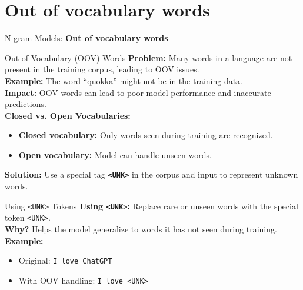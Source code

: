 \section{Out of vocabulary words}
\begin{frame}{}
    \LARGE N-gram Models: \textbf{Out of vocabulary words}
\end{frame}

\begin{frame}{Out of Vocabulary (OOV) Words}
    \textbf{Problem:} Many words in a language are not present in the training corpus, leading to OOV issues. \\
    \vspace{1em}
    \pause
    \textbf{Example:} The word ``quokka'' might not be in the training data. \\
    \vspace{1em}
    \pause
    \textbf{Impact:} OOV words can lead to poor model performance and inaccurate predictions. \\
    \vspace{1em}
    \pause
    \textbf{Closed vs. Open Vocabularies:}
    \begin{itemize}
        \item \textbf{Closed vocabulary:} Only words seen during training are recognized.
        \item \textbf{Open vocabulary:} Model can handle unseen words.
    \end{itemize}
    \vspace{0.5em}
    \pause
    \textbf{Solution:} Use a special tag \textbf{\texttt{<UNK>}} in the corpus and input to represent unknown words.
\end{frame}

\begin{frame}{Using \texttt{<UNK>} Tokens}
    \textbf{Using \texttt{<UNK>}:} Replace rare or unseen words with the special token \texttt{<UNK>}. \\
    \vspace{1em}
    \pause
    \textbf{Why?} Helps the model generalize to words it has not seen during training. \\
    \vspace{1em}
    \pause
    \textbf{Example:}
    \begin{itemize}
        \item Original: \texttt{I love ChatGPT}
        \item With OOV handling: \texttt{I love <UNK>}
    \end{itemize}
\end{frame}

